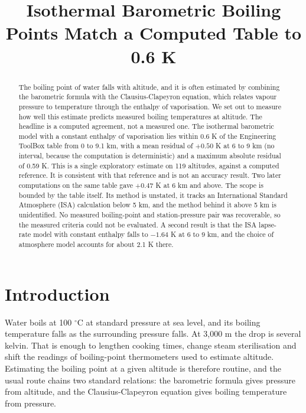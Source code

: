 \documentclass[11pt,letterpaper]{article}
\title{Isothermal Barometric Boiling Points Match a Computed Table to 0.6 K}
\author{}
\date{}
\begin{document}
\maketitle

\begin{abstract}
The boiling point of water falls with altitude, and it is often estimated by combining the barometric formula with the Clausius-Clapeyron equation, which relates vapour pressure to temperature through the enthalpy of vaporisation. We set out to measure how well this estimate predicts measured boiling temperatures at altitude. The headline is a computed agreement, not a measured one. The isothermal barometric model with a constant enthalpy of vaporisation lies within 0.6 K of the Engineering ToolBox table from 0 to 9.1 km, with a mean residual of $+0.50$ K at 6 to 9 km (no interval, because the computation is deterministic) and a maximum absolute residual of 0.59 K. This is a single exploratory estimate on 119 altitudes, against a computed reference. It is consistent with that reference and is not an accuracy result. Two later computations on the same table gave $+0.47$ K at 6 km and above. The scope is bounded by the table itself. Its method is unstated, it tracks an International Standard Atmosphere (ISA) calculation below 5 km, and the method behind it above 5 km is unidentified. No measured boiling-point and station-pressure pair was recoverable, so the measured criteria could not be evaluated. A second result is that the ISA lapse-rate model with constant enthalpy falls to $-1.64$ K at 6 to 9 km, and the choice of atmosphere model accounts for about 2.1 K there.
\end{abstract}

\section{Introduction}\label{sec:intro}

Water boils at 100 $^\circ$C at standard pressure at sea level, and its boiling temperature falls as the surrounding pressure falls. At 3,000 m the drop is several kelvin. That is enough to lengthen cooking times, change steam sterilisation and shift the readings of boiling-point thermometers used to estimate altitude. Estimating the boiling point at a given altitude is therefore routine, and the usual route chains two standard relations: the barometric formula gives pressure from altitude, and the Clausius-Clapeyron equation gives boiling temperature from pressure.
\end{document}
